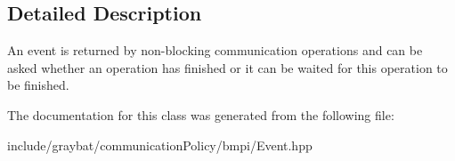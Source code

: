 \subsection{Detailed Description}
An event is returned by non-\/blocking communication operations and can be asked whether an operation has finished or it can be waited for this operation to be finished. 

The documentation for this class was generated from the following file\+:\begin{DoxyCompactItemize}
\item 
include/graybat/communication\+Policy/bmpi/Event.\+hpp\end{DoxyCompactItemize}
